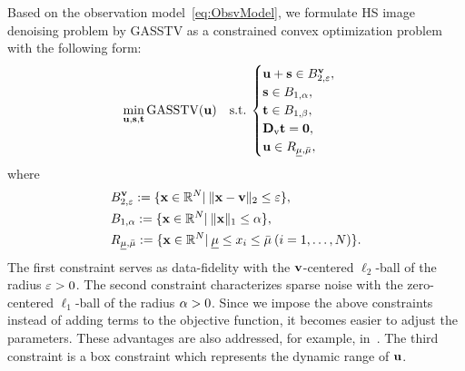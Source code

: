 Based on the observation model~\eqref{eq:ObsvModel}, we formulate HS image denoising problem by GASSTV as a constrained convex optimization problem with the following form:
\begin{equation}
    \label{prob:OptimProb}
    \min_{\mathbf{u}, \mathbf{s}, \mathbf{t}} \text{GASSTV}(\mathbf{u}) \quad \mathrm{s.t.} \: 
    \begin{cases}
        \mathbf{u} + \mathbf{s} \in B_{2, \varepsilon}^{\mathbf{v}}, \\
        \mathbf{s} \in B_{1, \alpha}, \\
        \mathbf{t} \in B_{1, \beta}, \\
        \mathbf{D}_{\text{v}} \mathbf{t} = \mathbf{0}, \\
        \mathbf{u} \in R_{\underline{\mu},\bar{\mu}}, \\
    \end{cases}
\end{equation}
where
\begin{align}
    \label{eq:ConstL2ball}
    &B_{2, \varepsilon}^{\mathbf{v}} := \{ \mathbf{x} \in \mathbb{R}^{N} | \:
    \|\mathbf{x} - \mathbf{v}\|_2 \leq \varepsilon \}, \\
    \label{eq:ConstL1ball}
    &B_{1, \alpha} := \{ \mathbf{x} \in \mathbb{R}^{N} | \:
    \|\mathbf{x}\|_{1} \leq \alpha \}, \\
    \label{eq:ConstBox}
    &R_{\underline{\mu},\bar{\mu}} := \{ \mathbf{x} \in \mathbb{R}^{N} | \:
    \underline{\mu} \leq x_{i} \leq \bar{\mu}  \: (i = 1,\dots , N) \}.
\end{align}
The first constraint serves as data-fidelity with the $\mathbf{v}$-centered $\ell_2$-ball of the radius $\varepsilon > 0$.
The second constraint characterizes sparse noise with the zero-centered $\ell_1$-ball of the radius $\alpha > 0$.
Since we impose the above constraints instead of adding terms to the objective function, it becomes easier to adjust the parameters.
These advantages are also addressed, for example, in~\cite{Afonso2011Constraint, chierchia2015Constraint, Ono2015Constraint, Ono2017Constraint, Ono2019Constraint}.
The third constraint is a box constraint which represents the dynamic range of $\mathbf{u}$.

% 


% 
% 
